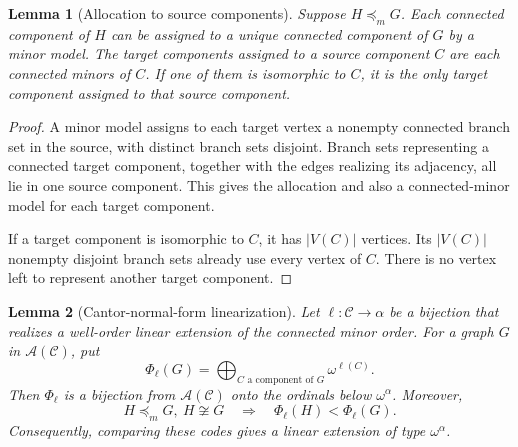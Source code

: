 \documentclass[11pt,letterpaper]{article}
\theoremstyle{plain}
\newtheorem{lemma}[lemma]{Lemma}
\theoremstyle{definition}
\theoremstyle{remark}
\newcommand{\minor}{\preccurlyeq_{\!m}}
\newcommand{\Cl}{\mathcal C}
\newcommand{\Add}{\mathcal A}
\newcommand{\bigop}{\mathop{\bigoplus}}
\begin{document}
\begin{lemma}[Allocation to source components]\label{lem:componentallocation}
Suppose $H\minor G$. Each connected component of $H$ can be assigned to a
unique connected component of $G$ by a minor model. The target components
assigned to a source component $C$ are each connected minors of $C$.
If one of them is isomorphic to $C$, it is the only target component
assigned to that source component.
\end{lemma}

\begin{proof}
A minor model assigns to each target vertex a nonempty connected branch
set in the source, with distinct branch sets disjoint. Branch sets
representing a connected target component, together with the edges
realizing its adjacency, all lie in one source component. This gives the
allocation and also a connected-minor model for each target component.

If a target component is isomorphic to $C$, it has $|V(C)|$ vertices.
Its $|V(C)|$ nonempty disjoint branch sets already use every vertex of
$C$. There is no vertex left to represent another target component.
\end{proof}

\begin{lemma}[Cantor-normal-form linearization]\label{lem:CNF}
Let $\ell:\Cl\to\alpha$ be a bijection that realizes a well-order
linear extension of the connected minor order. For a graph $G$ in
$\Add(\Cl)$, put
\begin{equation}\label{eq:generalcode}
 \Phi_\ell(G)=\bigop_{C\text{ a component of }G}\omega^{\ell(C)}.
\end{equation}
Then $\Phi_\ell$ is a bijection from $\Add(\Cl)$ onto the ordinals below
$\omega^\alpha$. Moreover,
\[
 H\minor G,\ H\not\cong G
 \quad\Longrightarrow\quad
 \Phi_\ell(H)<\Phi_\ell(G).
\]
Consequently, comparing these codes gives a linear extension of type
$\omega^\alpha$.
\end{lemma}
\end{document}
